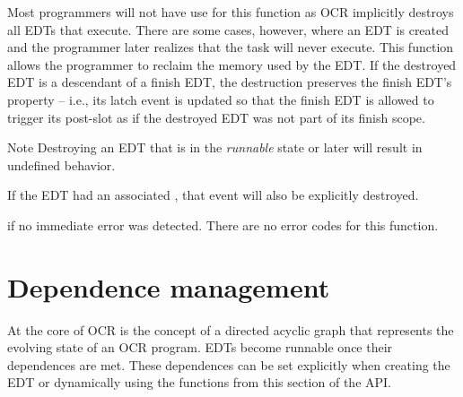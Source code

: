 \descr
Most programmers will not have use for this function as OCR implicitly destroys all
EDTs that execute. There are some cases, however, where an EDT is created and the
programmer later realizes that the task will never execute. This function allows the
programmer to reclaim the memory used by the EDT. If the destroyed EDT is a
descendant of a finish EDT, the destruction preserves the finish EDT's property --
i.e., its latch event is updated so that the finish EDT is allowed to trigger
its post-slot as if the destroyed EDT was not part of its finish scope.
\begin{DoxyNote}{Note}
Destroying an EDT that is in the \emph{runnable} state or later will result in
undefined behavior.

If the EDT had an associated , that event will also be explicitly
destroyed.
\end{DoxyNote}

 if no immediate error was detected. There are no error codes for this function.
\section{Dependence management}
\label{sec:OCRDependenceManagement}

At the core of OCR is the concept of a directed acyclic graph that represents the evolving
state of an OCR program. EDTs become runnable once their dependences are met.
These dependences can be set explicitly when creating the EDT or dynamically using
the functions from this section of the API.

